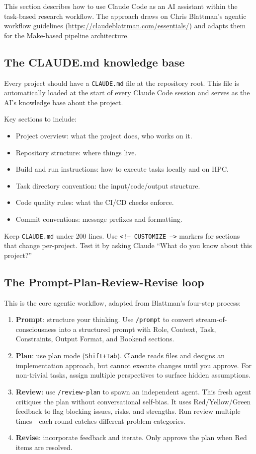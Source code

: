 This section describes how to use Claude Code as an AI assistant within the
task-based research workflow.
The approach draws on Chris Blattman's agentic workflow guidelines
(\url{https://claudeblattman.com/essentials/})
and adapts them for the Make-based pipeline architecture.

\subsection{The CLAUDE.md knowledge base}

Every project should have a \texttt{CLAUDE.md} file at the repository root.
This file is automatically loaded at the start of every Claude Code session
and serves as the AI's knowledge base about the project.

Key sections to include:
\begin{itemize}
	\item Project overview: what the project does, who works on it.
	\item Repository structure: where things live.
	\item Build and run instructions: how to execute tasks locally and on HPC.
	\item Task directory convention: the input/code/output structure.
	\item Code quality rules: what the CI/CD checks enforce.
	\item Commit conventions: message prefixes and formatting.
\end{itemize}

Keep \texttt{CLAUDE.md} under 200 lines.
Use \texttt{<!-- CUSTOMIZE -->} markers for sections that change per-project.
Test it by asking Claude ``What do you know about this project?''

\subsection{The Prompt-Plan-Review-Revise loop}

This is the core agentic workflow, adapted from Blattman's four-step process:

\begin{enumerate}
	\item \textbf{Prompt}: structure your thinking.
	Use \texttt{/prompt} to convert stream-of-consciousness into a structured prompt
	with Role, Context, Task, Constraints, Output Format, and Bookend sections.
	\item \textbf{Plan}: use plan mode (\texttt{Shift+Tab}).
	Claude reads files and designs an implementation approach,
	but cannot execute changes until you approve.
	For non-trivial tasks, assign multiple perspectives to surface hidden assumptions.
	\item \textbf{Review}: use \texttt{/review-plan} to spawn an independent agent.
	This fresh agent critiques the plan without conversational self-bias.
	It uses Red/Yellow/Green feedback to flag blocking issues, risks, and strengths.
	Run review multiple times---each round catches different problem categories.
	\item \textbf{Revise}: incorporate feedback and iterate.
	Only approve the plan when Red items are resolved.
\end{enumerate}

